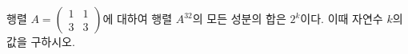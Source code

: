 행렬 $A=\begin{pmatrix} 1 & 1 \\ 3 & 3 \end{pmatrix}$에 대하여 행렬 $A^{32}$의 모든 성분의 합은 $2^k$이다. 이때 자연수 $k$의 값을 구하시오.
